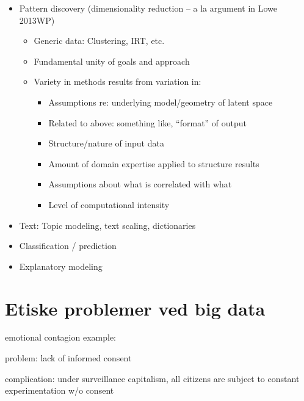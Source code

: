\documentclass[12pt,]{article}
\providecommand{\tightlist}{%
  \setlength{\itemsep}{0pt}\setlength{\parskip}{0pt}}
\begin{document}
\begin{itemize}
\item
  Pattern discovery (dimensionality reduction -- a la argument in Lowe
  2013WP)

  \begin{itemize}
  \tightlist
  \item
    Generic data: Clustering, IRT, etc.
  \item
    Fundamental unity of goals and approach
  \item
    Variety in methods results from variation in:

    \begin{itemize}
    \tightlist
    \item
      Assumptions re: underlying model/geometry of latent space
    \item
      Related to above: something like, ``format'' of output
    \item
      Structure/nature of input data
    \item
      Amount of domain expertise applied to structure results
    \item
      Assumptions about what is correlated with what
    \item
      Level of computational intensity
    \end{itemize}
  \end{itemize}
\item
  Text: Topic modeling, text scaling, dictionaries
\item
  Classification / prediction
\item
  Explanatory modeling
\end{itemize}

\hypertarget{etiske-problemer-ved-big-data}{%
\section{Etiske problemer ved big
data}\label{etiske-problemer-ved-big-data}}

emotional contagion example: \citet{kramer2014experimental}

problem: lack of informed consent

complication: under surveillance capitalism, all citizens are subject to
constant experimentation w/o consent


\end{document}
